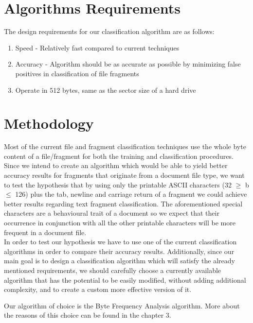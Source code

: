 \section{Algorithms Requirements}
The design requirements for our classification algorithm are as follows:
\begin{enumerate}
\item Speed - Relatively fast compared to current techniques
\item Accuracy - Algorithm should be as accurate as possible by minimizing false positives in classification of file fragments
\item Operate in 512 bytes, same as the sector size of a hard drive

\end{enumerate}

\pagebreak
\section{Methodology}
Most of the current file and fragment classification techniques use the whole byte content of a file/fragment for both the training and classification procedures. Since we intend to create an algorithm which would be able to yield better accuracy results for fragments that originate from a document file type, we want to test the hypothesis that by using only the printable ASCII characters (32 $\geq$  b $\leq$ 126) plus the tab, newline and carriage return of a fragment we could achieve better results regarding text fragment classification. The aforementioned special characters are a behavioural trait of a document so we expect that their occurrence in conjunction with all the other printable characters will be more frequent in a document file.\\

In order to test our hypothesis we have to use one of the current classification algorithms in order to compare their accuracy results. Additionally, since our main goal is to design a classification algorithm  which will satisfy the already mentioned requirements, we should carefully choose a currently available algorithm that has the potential to be easily modified, without adding additional complexity, and to create a custom more effective version of it.

Our algorithm of choice is the Byte Frequency Analysis algorithm. More about the reasons of this choice can be found in the chapter 3.\\



